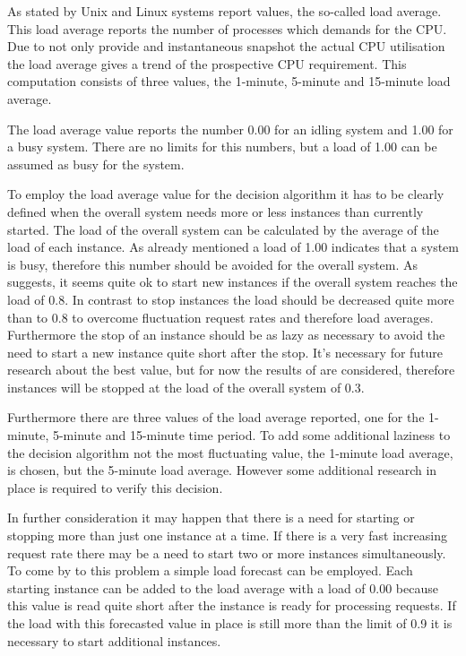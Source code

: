 As stated by \citet{walker2006} Unix and Linux systems report values, the so-called load average. This load average reports the number of processes which demands for the CPU. Due to not only provide and instantaneous snapshot the actual CPU utilisation the load average gives a trend of the prospective CPU requirement. This computation consists of three values, the 1-minute, 5-minute and 15-minute load average. 

The load average value reports the number 0.00 for an idling system and 1.00 for a busy system. There are no limits for this numbers, but a load of 1.00 can be assumed as busy for the system. 

To employ the load average value for the decision algorithm it has to be clearly defined when the overall system needs more or less instances than currently started. The load of the overall system can be calculated by the average of the load of each instance. As already mentioned a load of 1.00 indicates that a system is busy, therefore this number should be avoided for the overall system. As \citet{brebner} suggests, it seems quite ok to start new instances if the overall system reaches the load of 0.8. In contrast to stop instances the load should be decreased quite more than to 0.8 to overcome fluctuation request rates and therefore load averages. Furthermore the stop of an instance should be as lazy as necessary to avoid the need to start a new instance quite short after the stop. It's necessary for future research about the best value, but for now the results of \citet{brebner} are considered, therefore instances will be stopped at the load of the overall system of 0.3. 

Furthermore there are three values of the load average reported, one for the 1-minute, 5-minute and 15-minute time period. To add some additional laziness to the decision algorithm not the most fluctuating value, the 1-minute load average, is chosen, but the 5-minute load average. However some additional research in place is required to verify this decision.  

In further consideration it may happen that there is a need for starting or stopping more than just one instance at a time. If there is a very fast increasing request rate there may be a need to start two or more instances simultaneously. To come by to this problem a simple load forecast can be employed. Each starting instance can be added to the load average with a load of 0.00 because this value is read quite short after the instance is ready for processing requests. If the load with this forecasted value in place is still more than the limit of 0.9 it is necessary to start additional instances. 

